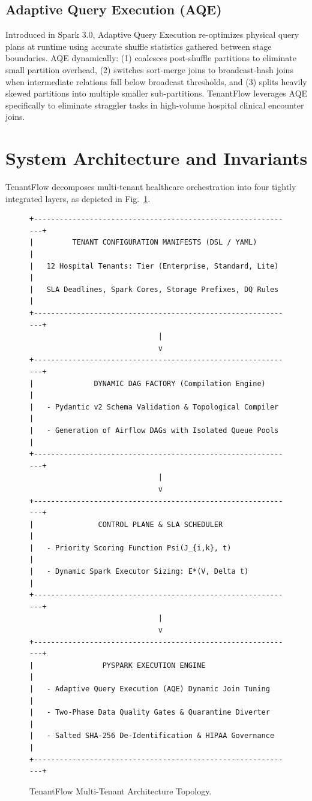 \documentclass[10pt,journal,compsoc]{IEEEtran}
\begin{document}
\subsection{Adaptive Query Execution (AQE)}
Introduced in Spark 3.0, Adaptive Query Execution re-optimizes physical query plans at runtime using accurate shuffle statistics gathered between stage boundaries. AQE dynamically:
(1) coalesces post-shuffle partitions to eliminate small partition overhead,
(2) switches sort-merge joins to broadcast-hash joins when intermediate relations fall below broadcast thresholds, and
(3) splits heavily skewed partitions into multiple smaller sub-partitions. TenantFlow leverages AQE specifically to eliminate straggler tasks in high-volume hospital clinical encounter joins.

\section{System Architecture and Invariants}
TenantFlow decomposes multi-tenant healthcare orchestration into four tightly integrated layers, as depicted in Fig.~\ref{fig:arch}.

\begin{figure}[!t]
\centering
\begin{lstlisting}
+-------------------------------------------------------------+
|         TENANT CONFIGURATION MANIFESTS (DSL / YAML)         |
|   12 Hospital Tenants: Tier (Enterprise, Standard, Lite)    |
|   SLA Deadlines, Spark Cores, Storage Prefixes, DQ Rules    |
+-------------------------------------------------------------+
                              |
                              v
+-------------------------------------------------------------+
|              DYNAMIC DAG FACTORY (Compilation Engine)        |
|   - Pydantic v2 Schema Validation & Topological Compiler    |
|   - Generation of Airflow DAGs with Isolated Queue Pools    |
+-------------------------------------------------------------+
                              |
                              v
+-------------------------------------------------------------+
|               CONTROL PLANE & SLA SCHEDULER                 |
|   - Priority Scoring Function Psi(J_{i,k}, t)               |
|   - Dynamic Spark Executor Sizing: E*(V, Delta t)           |
+-------------------------------------------------------------+
                              |
                              v
+-------------------------------------------------------------+
|                PYSPARK EXECUTION ENGINE                     |
|   - Adaptive Query Execution (AQE) Dynamic Join Tuning      |
|   - Two-Phase Data Quality Gates & Quarantine Diverter      |
|   - Salted SHA-256 De-Identification & HIPAA Governance     |
+-------------------------------------------------------------+
\end{lstlisting}
\caption{TenantFlow Multi-Tenant Architecture Topology.}
\label{fig:arch}
\end{figure}
\end{document}

